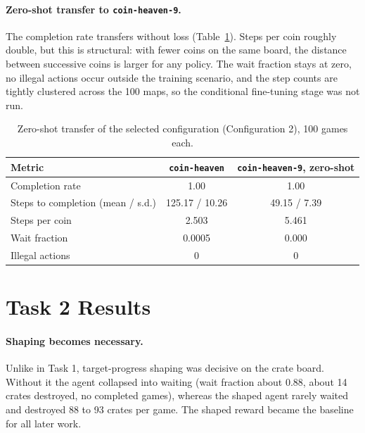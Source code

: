 \documentclass[11pt,a4paper]{report}
\begin{document}
	
	\paragraph{Zero-shot transfer to \texttt{coin-heaven-9}.} The completion rate transfers without loss (Table~\ref{tab:rhine_task1_zero_shot}). Steps per coin roughly double, but this is structural: with fewer coins on the same board, the distance between successive coins is larger for any policy. The wait fraction stays at zero, no illegal actions occur outside the training scenario, and the step counts are tightly clustered across the 100 maps, so the conditional fine-tuning stage was not run.
	
	\begin{table}[htbp]
		\centering
		\begin{tabular}{lcc}
			\toprule
			Metric & \texttt{coin-heaven} & \texttt{coin-heaven-9}, zero-shot \\
			\midrule
			Completion rate & 1.00 & 1.00 \\
			Steps to completion (mean / s.d.) & 125.17 / 10.26 & 49.15 / 7.39 \\
			Steps per coin & 2.503 & 5.461 \\
			Wait fraction & 0.0005 & 0.000 \\
			Illegal actions & 0 & 0 \\
			\bottomrule
		\end{tabular}
		\caption{Zero-shot transfer of the selected configuration (Configuration 2), 100 games each.}
		\label{tab:rhine_task1_zero_shot}
	\end{table}
	
	
	\section{Task 2 Results}
	\label{subsec:rhine_results_task2}
	
	\paragraph{Shaping becomes necessary.} Unlike in Task 1, target-progress shaping was decisive on the crate board. Without it the agent collapsed into waiting (wait fraction about 0.88, about 14 crates destroyed, no completed games), whereas the shaped agent rarely waited and destroyed 88 to 93 crates per game. The shaped reward became the baseline for all later work.
	
\end{document}
